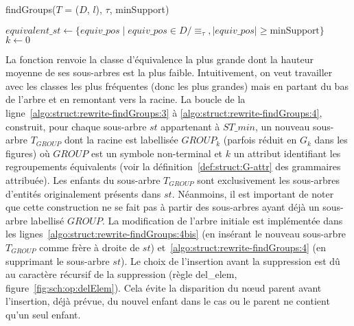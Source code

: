 \begin{procedure}[htb]
    \caption{findGroups($T$ = ($D$, $l$), $\tau$, minSupport)}
    \label{algo:struct:rewrite-findGroups}

    $equivalent\_st \gets \{equiv\_pos \mid equiv\_pos \in D/\equiv_\tau, |equiv\_pos| \ge \text{minSupport}\}$ \label{algo:struct:rewrite-findGroups:1}\;
    $k \gets 0$\;

\end{procedure}

La fonction \findSTwithMinLeavesTree renvoie la classe d'équivalence la plus grande dont la hauteur moyenne de ses sous-arbres est la plus faible.
Intuitivement, on veut travailler avec les classes les plus fréquentes (donc les plus grandes) mais en partant du bas de l'arbre et en remontant vers la racine.
La boucle  de la ligne~\ref{algo:struct:rewrite-findGroups:3} à \ref{algo:struct:rewrite-findGroups:4}, construit, pour chaque sous-arbre $st$ appartenant à $ST\_min $, un nouveau sous-arbre $T_{GROUP}$ dont la racine est labellisée $GROUP_k$ (parfois réduit en $G_k$ dans les figures) où $GROUP$ est un symbole non-terminal et $k$ un attribut identifiant les regroupements équivalents (voir la définition~\ref{def:struct:G-attr} des grammaires attribuée).
Les enfants du sous-arbre $T_{GROUP}$ sont exclusivement les sous-arbres d'entités originalement présents dans $st$.
Néanmoins, il est important de noter que cette construction ne se fait pas à partir des sous-arbres ayant déjà un sous-arbre labellisé $GROUP$.
La modification de l'arbre initiale est implémentée dans les lignes~\ref{algo:struct:rewrite-findGroups:4bis} (en insérant le nouveau sous-arbre $T_{GROUP}$ comme frère à droite de $st$) et~\ref{algo:struct:rewrite-findGroups:4} (en supprimant le sous-arbre $st$).
Le choix de l'insertion avant la suppression est dû au caractère récursif de la suppression (règle \textsf{del\_elem}, figure~\ref{fig:sch:op:delElem}).
Cela évite la disparition du nœud parent avant l'insertion, déjà prévue, du nouvel enfant dans le cas ou le parent ne contient qu'un seul enfant.


